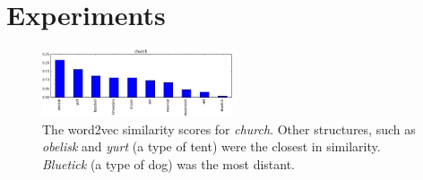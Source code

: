 \section{Experiments}

\begin{figure}[t]
  \centering
  \includegraphics[width=0.5\textwidth]{figs/word2vec_church.png}
  \caption{
    The word2vec similarity scores for \emph{church}. Other structures, such as
    \emph{obelisk} and \emph{yurt} (a type of tent) were the closest in
    similarity. \emph{Bluetick} (a type of dog) was the most distant.
  }
  \label{fig:word2vec_similarities}
\end{figure}




